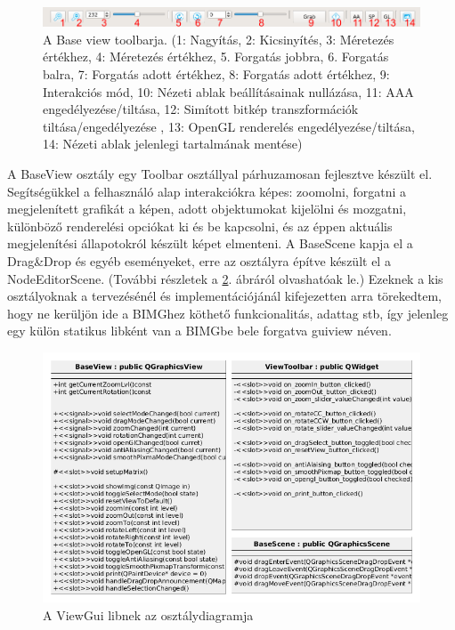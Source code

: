 \documentclass[a4paper,12pt,oneside]{report}
\begin{document}
\begin{center}
\begin{figure}[h]
  \includegraphics[width=1\textwidth]{toolbar.png}
  \caption{A Base view toolbarja. (1: Nagyítás, 2: Kicsinyítés, 3: Méretezés értékhez, 4: Méretezés értékhez, 5. Forgatás jobbra, 6. Forgatás balra, 7: Forgatás adott értékhez, 8: Forgatás adott értékhez, 9: Interakciós mód, 10: Nézeti ablak beállításainak nullázása, 11: AAA engedélyezése/tiltása, 12: Simított bitkép transzformációk tiltása/engedélyezése , 13: OpenGL renderelés engedélyezése/tiltása, 14: Nézeti ablak jelenlegi tartalmának mentése) }
  \label{fig:bimg_viewgui_toolbar}
\end{figure}
\end{center}
A BaseView osztály egy Toolbar osztállyal párhuzamosan fejlesztve készült el. Segítségükkel a felhasználó alap interakciókra képes: zoomolni, forgatni a megjelenített grafikát a képen, adott objektumokat kijelölni és mozgatni, különböző renderelési opciókat ki és be kapcsolni, és az éppen aktuális megjelenítési állapotokról készült képet elmenteni. A BaseScene kapja el a Drag\&Drop és egyéb eseményeket, erre az osztályra építve készült el a NodeEditorScene. (További részletek a \ref{fig:bimg_viewgui}. ábráról olvashatóak le.)
Ezeknek a kis osztályoknak a tervezésénél és implementációjánál kifejezetten arra törekedtem, hogy ne kerüljön ide a BIMGhez köthető funkcionalitás, adattag stb, így jelenleg egy külön statikus libként van a BIMGbe bele forgatva guiview néven.
\begin{center}
\begin{figure}[h]
  \includegraphics[width=1\textwidth]{viewgui_dia.png}
  \caption{A ViewGui libnek az osztálydiagramja}
  \label{fig:bimg_viewgui}
\end{figure}
\end{center}
\end{document}

